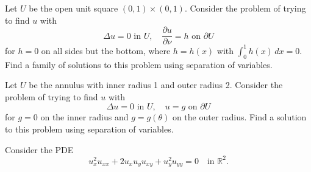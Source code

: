 \documentclass[12pt,fleqn,leqno]{exam}
\newcommand{\R}{\ensuremath{\mathbb{R}}}
\begin{document}
\begin{questions}

\question Let $U$ be the open unit square $(0,1) \times (0,1)$. Consider the problem of trying to find $u$ with
\[
\Delta u = 0 \text{ in $U$}, \quad
\frac{\partial u}{\partial\nu} = h \text{ on $\partial U$}
\]
for $h = 0$ on all sides but the bottom, where $h = h(x)$ with $\int_0^1 h(x)\,dx = 0$. Find a family of solutions to this problem using separation of variables.

\question Let $U$ be the annulus with inner radius 1 and outer radius 2. Consider the problem of trying to find $u$ with
\[
\Delta u = 0 \text{ in $U$}, \quad
u = g \text{ on $\partial U$}
\]
for $g = 0$ on the inner radius and $g = g(\theta)$ on the outer radius. Find a solution to this problem using separation of variables.

\question Consider the PDE
\[u_x^2 u_{xx} + 2 u_x u_y u_{xy} + u_y^2 u_{yy} = 0 \quad \text{in $\R^2$}.\]


\end{questions}
\end{document}
